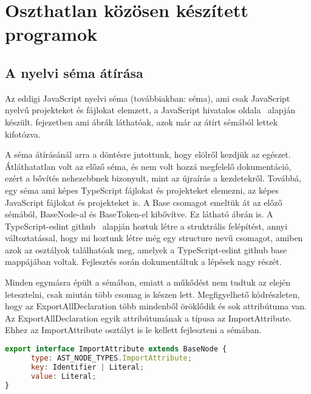 \chapter{Oszthatlan közösen készített programok}\label{chap:oszthatlan_kozos_dolgok}

\section{A nyelvi séma átírása}

\noindent

Az eddigi JavaScript nyelvi séma (továbbiakban: séma), ami csak JavaScript nyelvű projekteket és fájlokat elemzett, a JavaScript hivatalos oldala~\cite{javascript_language} alapján készült.
 fejezetben ami ábrák láthatóak, azok már az átírt sémából lettek kifotózva.

\noindent

A séma átírásánál arra a döntésre jutottunk, hogy elölről kezdjük az egészet.
Átláthatatlan volt az előző séma, és nem volt hozzá megfelelő dokumentáció, ezért a bővítés nehezebbnek bizonyult, mint az újraírás a kezdetekről.
Továbbá, egy séma ami képes TypeScript fájlokat és projekteket elemezni, az képes JavaScript fájlokat és projekteket is.
A Base csomagot emeltük át az előző sémából, BaseNode-al és BaseToken-el kibővítve. Ez látható  ábrán is.
A TypeScript-eslint github~\cite{typescript-eslint} alapján hoztuk létre a struktrális felépítést,
annyi változtatással, hogy mi hoztunk létre még egy structure nevű csomagot, amiben azok az osztályok találhatóak meg, amelyek a TypeScript-eslint github base mappájában voltak.
Fejlesztés során dokumentáltuk a lépések nagy részét.

\noindent

Minden egymásra épült a sémában, emiatt a műkődést nem tudtuk az elején letesztelni, csak miután több csomag is készen lett.
Megfigyelhető  kódrészleten, hogy az ExportAllDeclaration több mindenből öröklődik és sok attribútuma van.
Az ExportAllDeclaration egyik attribútumának a típusa az ImportAttribute.
Ehhez az ImportAttribute osztályt is le kellett fejleszteni a sémában.

\begin{lstlisting}[caption={ImportAttribute},label={lst:asg_file_import_attribute}, language={JavaScript}]
export interface ImportAttribute extends BaseNode {
      type: AST_NODE_TYPES.ImportAttribute;
      key: Identifier | Literal;
      value: Literal;
}
\end{lstlisting}

